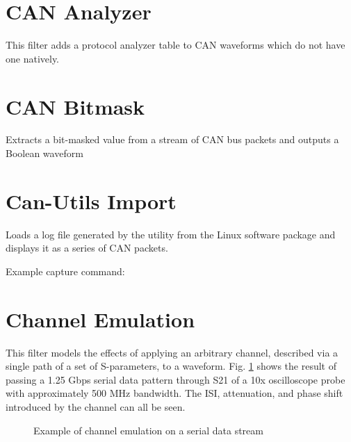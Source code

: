 \pagebreak
\section{CAN Analyzer}
\label{filter:cananalyzer}

This filter adds a protocol analyzer table to CAN waveforms which do not have one natively.

\pagebreak
\section{CAN Bitmask}
\label{filter:canbitmask}

Extracts a bit-masked value from a stream of CAN bus packets and outputs a Boolean waveform

\pagebreak
\section{Can-Utils Import}

Loads a log file generated by the  utility from the Linux  software package and
displays it as a series of CAN packets.

Example capture command: 

\pagebreak
\section{Channel Emulation}
\label{filter:channelemu}

This filter models the effects of applying an arbitrary channel, described via a single path of a set of S-parameters,
to a waveform. Fig. \ref{filter_channelemu} shows the result of passing a 1.25 Gbps serial data pattern through S21 of
a 10x oscilloscope probe with approximately 500 MHz bandwidth. The ISI, attenuation, and phase shift introduced by the
channel can all be seen.

\begin{figure}[h]
\centering
{}
\caption{Example of channel emulation on a serial data stream}
\label{filter_channelemu}
\end{figure}

